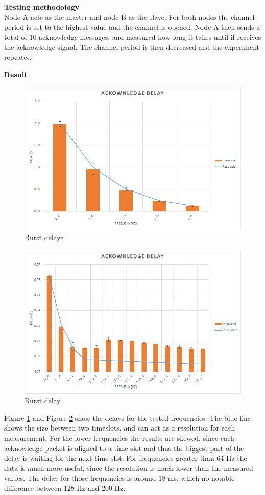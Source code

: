 \begin{description}
	\item{\textbf{Testing methodology}} \hfill \\ Node A acts as the master and node B as the slave. For both nodes the channel period is set to the highest value and the channel is opened. Node A then sends a total of 10 acknowledge messages, and measured how long it takes until if receives the acknowledge signal. The channel period is then decreased and the experiment repeated.
	\item{\textbf{Result}} \hfill \\  
	\begin{figure}[h]
		\centering
		\includegraphics[scale=0.5]{./pics/exp3_norm.png}
		\caption{Burst delaye}\label{fig:exp3low}
	\end{figure}
		\begin{figure}[h]
			\centering
			\includegraphics[scale=0.5]{./pics/exp3_detail.png}
			\caption{Burst delay}\label{fig:exp3high}
		\end{figure}
	Figure \ref{fig:exp3low} and Figure \ref{fig:exp3high} show the delays for the tested frequencies. The blue line shows the size between two timeslots, and can act as a resolution for each measurement. For the lower frequencies the results are skewed, since each acknowledge packet is aligned to a time-slot and thus the biggest part of the delay is waiting for the next time-slot. For frequencies greater than 64 Hz the data is much more useful, since the resolution is much lower than the measured values. The delay for those frequencies is around 18 ms, which no notable difference between 128 Hz and 200 Hz. 
\end{description}
